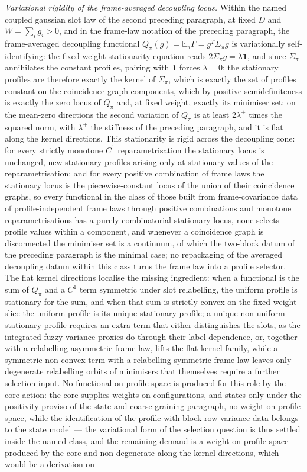 \emph{Variational rigidity of the frame-averaged decoupling locus.} Within the named coupled gaussian slot law of the second preceding paragraph, at fixed \(D\) and \(W=\sum_{i}g_{i}>0\), and in the frame-law notation of the preceding paragraph, the frame-averaged decoupling functional \(Q_{\pi}(g)=\mathbb{E}_{\pi}\Gamma=g^{T}\Sigma_{\pi}g\) is variationally self-identifying: the fixed-weight stationarity equation reads \(2\Sigma_{\pi}g=\lambda\mathbf{1}\), and since \(\Sigma_{\pi}\) annihilates the constant profiles, pairing with \(\mathbf{1}\) forces \(\lambda=0\); the stationary profiles are therefore exactly the kernel of \(\Sigma_{\pi}\), which is exactly the set of profiles constant on the coincidence-graph components, which by positive semidefiniteness is exactly the zero locus of \(Q_{\pi}\) and, at fixed weight, exactly its minimiser set; on the mean-zero directions the second variation of \(Q_{\pi}\) is at least \(2\lambda^{+}\) times the squared norm, with \(\lambda^{+}\) the stiffness of the preceding paragraph, and it is flat along the kernel directions. This stationarity is rigid across the decoupling cone: for every strictly monotone \(C^{1}\) reparametrisation the stationary locus is unchanged, new stationary profiles arising only at stationary values of the reparametrisation; and for every positive combination of frame laws the stationary locus is the piecewise-constant locus of the union of their coincidence graphs, so every functional in the class of those built from frame-covariance data of profile-independent frame laws through positive combinations and monotone reparametrisations has a purely combinatorial stationary locus, none selects profile values within a component, and whenever a coincidence graph is disconnected the minimiser set is a continuum, of which the two-block datum of the preceding paragraph is the minimal case; no repackaging of the averaged decoupling datum within this class turns the frame law into a profile selector. The flat kernel directions localise the missing ingredient: when a functional is the sum of \(Q_{\pi}\) and a \(C^{1}\) term symmetric under slot relabelling, the uniform profile is stationary for the sum, and when that sum is strictly convex on the fixed-weight slice the uniform profile is its unique stationary profile; a unique non-uniform stationary profile requires an extra term that either distinguishes the slots, as the integrated fuzzy variance proxies do through their label dependence, or, together with a relabelling-asymmetric frame law, lifts the flat kernel family, while a symmetric non-convex term with a relabelling-symmetric frame law leaves only degenerate relabelling orbits of minimisers that themselves require a further selection input. No functional on profile space is produced for this role by the core action: the core supplies weights on configurations, and states only under the positivity proviso of the state and coarse-graining paragraph, no weight on profile space, while the identification of the profile with block-row variance data belongs to the state model — the variational form of the selection question is thus settled inside the named class, and the remaining demand is a weight on profile space produced by the core and non-degenerate along the kernel directions, which would be a derivation on 